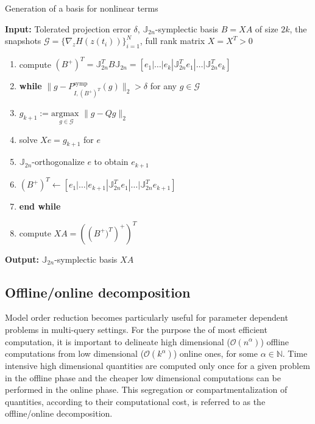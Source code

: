 \begin{algorithm} 
\caption{Generation of a basis for nonlinear terms} \label{alg:3}
{\bf Input:} Tolerated projection error $\delta$, $\mathbb J_{2n}$-symplectic basis $B = X A$ of size $2k$, the snapshots $\mathcal G = \{ \nabla_zH(z(t_i))\}_{i=1}^{N}$, full rank matrix $X=X^T>0$
\begin{enumerate}
\item compute $(B^+)^T = \mathbb J_{2n}^T B \mathbb J_{2n} = [e_1|\dots |e_{k} | \mathbb J_{2n}^Te_1|\dots| \mathbb J_{2n}^Te_{k}]$
\item \textbf{while} $\| g - P_{I,(B^+)^T}^{\text{symp}} (g) \|_2 > \delta$ for any $g \in \mathcal G$
\item \hspace{0.5cm} $g_{k+1} := \underset{g\in \mathcal G}{\text{argmax }} \| g -  Q g  \|_2$
\item \hspace{0.5cm} solve $X e = g_{k+1}$ for $e$
\item \hspace{0.5cm} $\mathbb J_{2n}$-orthogonalize $e$ to obtain $e_{k+1}$
\item \hspace{0.5cm} $(B^+)^T \leftarrow [e_1|\dots |e_{k+1} | \mathbb J_{2n}^Te_1|\dots| \mathbb J_{2n}^Te_{k+1}]$
\item \textbf{end while}
\item compute $XA = \left( \left (B^+)^T \right)^+ \right)^T$
\end{enumerate}
\vspace{0.5cm}
{\bf Output:} $\mathbb J_{2n}$-symplectic basis $XA$
\end{algorithm}

\subsection{Offline/online decomposition} \label{sec:normmor.4}
Model order reduction becomes particularly useful for parameter dependent problems in multi-query settings. For the purpose the of most efficient computation, it is important to delineate high dimensional ($\mathcal{O}(n^{\alpha})$) offline computations from low dimensional ($\mathcal{O}(k^{\alpha})$) online ones, for some $\alpha \in \mathbb N$. Time intensive high dimensional quantities are computed only once for a given problem in the offline phase and the cheaper low dimensional computations can be performed in the online phase. This segregation or compartmentalization of quantities, according to their computational cost, is referred to as the offline/online decomposition.

